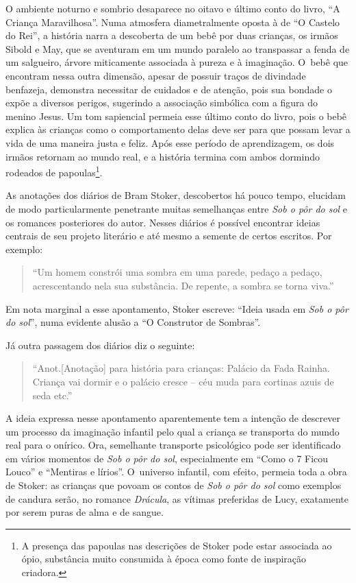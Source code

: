 O ambiente noturno e sombrio desaparece no oitavo e último conto do
livro, ``A Criança Maravilhosa''. Numa atmosfera diametralmente oposta à
de ``O Castelo do Rei'', a história narra a descoberta de um bebê por
duas crianças, os irmãos Sibold e May, que se aventuram em um mundo
paralelo ao transpassar a fenda de um salgueiro, árvore miticamente
associada à pureza e à imaginação. O~bebê que encontram nessa outra
dimensão, apesar de possuir traços de divindade benfazeja, demonstra
necessitar de cuidados e de atenção, pois sua bondade o expõe a diversos
perigos, sugerindo a associação simbólica com a figura do menino Jesus.
Um tom sapiencial permeia esse último conto do livro, pois o bebê
explica às crianças como o comportamento delas deve ser para que possam
levar a vida de uma maneira justa e feliz. Após esse período de
aprendizagem, os dois irmãos retornam ao mundo real, e a história
termina com ambos dormindo rodeados de
papoulas\footnote{A presença das papoulas nas descrições de
Stoker pode estar associada ao ópio, substância muito consumida à época
como fonte de inspiração criadora.}.

\asterisc{}


As anotações dos diários de Bram Stoker, descobertos há pouco tempo,
elucidam de modo particularmente penetrante muitas semelhanças entre \emph{Sob
o pôr do sol} e os romances posteriores do autor. Nesses diários é
possível encontrar ideias centrais de seu projeto literário e até mesmo
a semente de certos escritos. Por exemplo:

 

\begin{quote}
``Um homem constrói uma sombra em uma parede, pedaço a pedaço,
acrescentando nela sua substância. De repente, a sombra se torna viva.''

 

\end{quote}
Em nota marginal a esse apontamento, Stoker escreve: ``Ideia usada em
\emph{Sob o pôr do sol}'', numa evidente alusão a ``O Construtor de
Sombras''.

Já outra passagem dos diários diz o seguinte:

 

\begin{quote}
``Anot.{[}Anotação{]} para história para crianças: Palácio da Fada Rainha.
Criança vai dormir e o palácio cresce -- céu muda para cortinas azuis de
seda etc.''

 

\end{quote}
A ideia expressa nesse apontamento aparentemente tem a intenção de
descrever um processo da imaginação infantil pelo qual a criança se
transporta do mundo real para o onírico. Ora, semelhante transporte
psicológico pode ser identificado em vários momentos de \emph{Sob o pôr do
sol}, especialmente em ``Como o 7 Ficou Louco'' e ``Mentiras e lírios''.
O~universo infantil, com efeito, permeia toda a obra de Stoker: as
crianças que povoam os contos de \emph{Sob o pôr do sol} como exemplos de
candura serão, no romance \emph{Drácula}, as vítimas preferidas de Lucy,
exatamente por serem puras de alma e de sangue.

